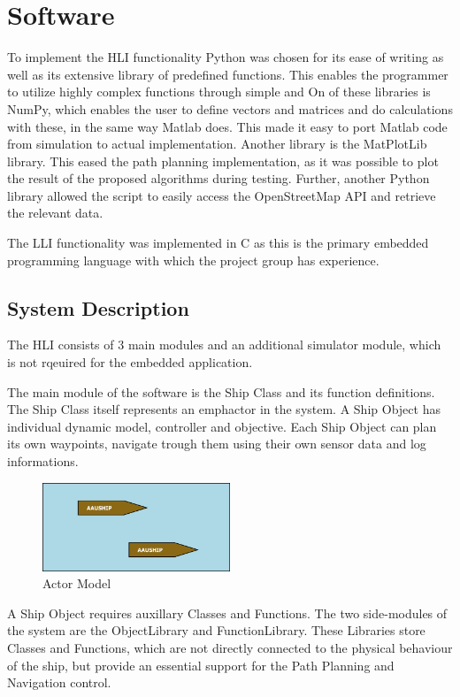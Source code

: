 \chapter{Software}

To implement the HLI functionality Python was chosen for its ease of writing as well as its extensive library of predefined functions. This enables the programmer to utilize highly complex functions through simple and  On of these libraries is NumPy, which enables the user to define vectors and matrices and do calculations with these, in the same way Matlab does. This made it easy to port Matlab code from simulation to actual implementation. Another library is the MatPlotLib library. This eased the path planning implementation, as it was possible to plot the result of the proposed algorithms during testing. Further, another Python library allowed the script to easily access the OpenStreetMap API and retrieve the relevant data.

The LLI functionality was implemented in C as this is the primary embedded programming language with which the project group has experience.

\section{System Description}

The HLI consists of 3 main modules and an additional simulator module, which is not rqeuired for the embedded application.

The main module of the software is the Ship Class and its function definitions.
The Ship Class itself represents an emph{actor} in the system. A Ship Object has individual dynamic model, controller and objective. Each Ship Object can plan its own waypoints, navigate trough them using their own sensor data and log informations.

\begin{figure}[htbp]
\centering
\includegraphics[width = 0.5\textwidth]{img/HLIFigures/ActorModel/Actor-model0.png}
\caption{Actor Model}
\label{fig:actor_model0}
\end{figure}

A Ship Object requires auxillary Classes and Functions. The two side-modules of the system are the ObjectLibrary and FunctionLibrary. These Libraries store Classes and Functions, which are not directly connected to the physical behaviour of the ship, but provide an essential support for the Path Planning and Navigation control.

